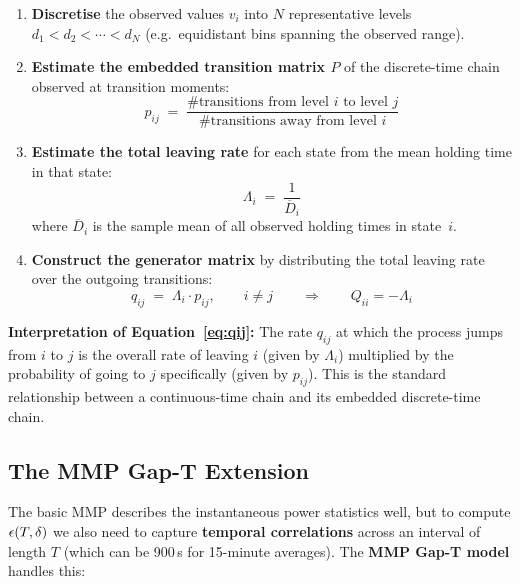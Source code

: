 \begin{enumerate}[leftmargin=2em, itemsep=6pt]
  \item \textbf{Discretise} the observed values $v_i$ into $N$
        representative levels $d_1 < d_2 < \cdots < d_N$
        (e.g.\ equidistant bins spanning the observed range).
 
  \item \textbf{Estimate the embedded transition matrix $P$} of
        the discrete-time chain observed at transition moments:
        \begin{equation}
          p_{ij}
          \;=\;
          \frac{\#\text{transitions from level }i\text{ to level }j}
               {\#\text{transitions away from level }i}
          \label{eq:pij}
        \end{equation}
 
  \item \textbf{Estimate the total leaving rate} for each state
        from the mean holding time in that state:
        \begin{equation}
          \Lambda_i
          \;=\;
          \frac{1}{\overline{D}_i}
          \label{eq:lambda_i}
        \end{equation}
        where $\overline{D}_i$ is the sample mean of all observed
        holding times in state~$i$.
 
  \item \textbf{Construct the generator matrix} by distributing
        the total leaving rate over the outgoing transitions:
        \begin{equation}
          q_{ij}
          \;=\;
          \Lambda_i \cdot p_{ij},
          \qquad i \neq j
          \label{eq:qij}
          \qquad\Longrightarrow\qquad
          Q_{ii} = -\Lambda_i
        \end{equation}
\end{enumerate}
 
\begin{notebox}
\textbf{Interpretation of Equation~\eqref{eq:qij}:}
The rate $q_{ij}$ at which the process jumps from $i$ to $j$ is
the overall rate of leaving $i$ (given by $\Lambda_i$) multiplied
by the probability of going to $j$ specifically (given by
$p_{ij}$). This is the standard relationship between a
continuous-time chain and its embedded discrete-time chain.
\end{notebox}
 
\subsection{The MMP Gap-T Extension}
The basic MMP describes the instantaneous power statistics well,
but to compute $\epsilon(T,\delta)$ we also need to capture
\textbf{temporal correlations} across an interval of length $T$
(which can be 900\,s for 15-minute averages). The
\textbf{MMP Gap-T model} handles this:
 
